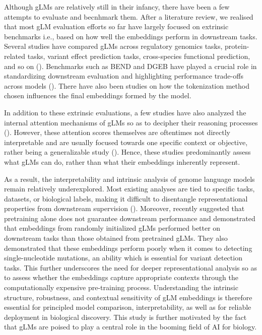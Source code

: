 \documentclass{ifacconf}
\begin{document}
Although gLMs are relatively still in their infancy, there have been a few attempts to evaluate and becnhmark them. After a literature review, we realised that most gLM evaluation efforts so far have largely focused on extrinsic benchmarks i.e., based on how well the embeddings perform in downstream tasks. Several studies have compared gLMs across regulatory genomics tasks, protein-related tasks, variant effect prediction tasks, cross-species functional prediction, and so on (\cite{Tang2024,Sasse2023,Habib2024,Kan-Tor2024}). Benchmarks such as BEND and DGEB have played a crucial role in standardizing downstream evaluation and highlighting performance trade-offs across models (\cite{Marin2024,West-Roberts2024}). There have also been studies on how the tokenization method chosen influences the final embeddings formed by the model. 

In addition to these extrinsic evaluations, a few studies have also analyzed the internal attention mechanisms of gLMs so as to decipher their reasoning processes (\cite{Consens2025,rajwade2024understanding}). However, these attention scores themselves are oftentimes not directly interpretable and are usually focused towards one specific context or objective, rather being a generalizable study (\cite{Consens2023}). Hence, these studies predominantly assess what gLMs can do, rather than what their embeddings inherently represent.

As a result, the interpretability and intrinsic analysis of genome language models remain relatively underexplored. Most existing analyses are tied to specific tasks, datasets, or biological labels, making it difficult to disentangle representational properties from downstream supervision (\cite{Zheng2024,Boshar2024}). Moreover, \cite{Vishniakov2024} recently suggested that pretraining alone does not guarantee downstream performance and demonstrated that embeddings from randomly initialized gLMs performed better on downstream tasks than those obtained from pretrained gLMs. They also demonstrated that these embeddings perform poorly when it comes to detecting single-nucleotide mutations, an ability which is essential for variant detection tasks. This further underscores the need for deeper representational analysis so as to assess whether the embeddings capture appropriate contexts through the computationally expensive pre-training process. Understanding the intrinsic structure, robustness, and contextual sensitivity of gLM embeddings is therefore essential for principled model comparison, interpretability, as well as for reliable deployment in biological discovery. This study is further motivated by the fact that gLMs are poised to play a central role in the booming field of AI for biology.
\end{document}
